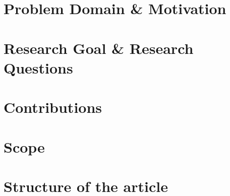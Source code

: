 \section{Problem Domain \& Motivation}



\section{Research Goal \& Research Questions}



\section{Contributions}

\section{Scope}

\section{Structure of the article}

